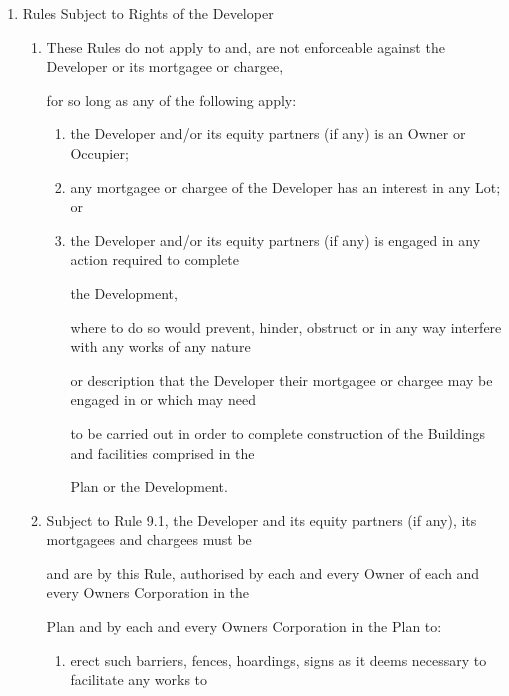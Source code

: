 \documentclass{article}
\begin{document}
\begin{enumerate}[label=\arabic*.]
\begin{enumerate}[label=\arabic{enumi}.\arabic*.]
\item {\fontsize{9.99}{1} Rules Subject to Rights of the Developer }

\begin{enumerate}[label=(\arabic*)]
\item {\fontsize{9.962}{1} These Rules do not apply to and, are not enforceable against the Developer or its mortgagee or chargee, }

{\fontsize{10.02}{1}for so long as any of the following apply: }

\begin{enumerate}[label=(\alph*)]
\item {\fontsize{9.962}{1} the Developer and/or its equity partners (if any) is an Owner or Occupier; }

\item {\fontsize{9.962}{1} any mortgagee or chargee of the Developer has an interest in any Lot; or }

\item {\fontsize{9.962}{1} the Developer and/or its equity partners (if any) is engaged in any action required to complete }

{\fontsize{10.02}{1}the Development, }

{\fontsize{10.02}{1}where to do so would prevent, hinder, obstruct or in any way interfere with any works of any nature }

{\fontsize{10.02}{1}or description that the Developer their mortgagee or chargee may be engaged in or which may need }

{\fontsize{10.02}{1}to be carried out in order to complete construction of the Buildings and facilities comprised in the }

{\fontsize{10.02}{1}Plan or the Development. }

\end{enumerate}
\item {\fontsize{9.962}{1} Subject to Rule 9.1, the Developer and its equity partners (if any), its mortgagees and chargees must be }

{\fontsize{10.02}{1}and are by this Rule, authorised by each and every Owner of each and every Owners Corporation in the }

{\fontsize{10.02}{1}Plan and by each and every Owners Corporation in the Plan to: }

\begin{enumerate}[label=(\alph*)]
\item {\fontsize{9.962}{1} erect such barriers, fences, hoardings, signs as it deems necessary to facilitate any works to }


\end{enumerate}
\end{enumerate}
\end{enumerate}
\end{enumerate}
\end{document}
